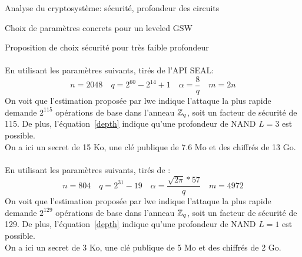 \begin{section}{Analyse du cryptosystème: sécurité, profondeur des circuits}
\begin{subsection}{Choix de paramètres concrets pour un leveled GSW}
	\begin{subsubsection}{Proposition de choix sécurité pour très faible profondeur}
	\paragraph{}
	En utilisant les paramètres suivants, tirés de l'API SEAL:
	\[n = 2048\quad q = 2^{60} - 2^{14} + 1 \quad \alpha = \frac{8}{q}\quad m = 2n \]
	On voit que l'estimation proposée par lwe indique  l'attaque la plus rapide demande $2^{115}$ opérations de base dans l'anneau $\mathbb{Z}_q$, soit un facteur de sécurité de 115. De plus, l'équation~\eqref{depth} indique qu'une profondeur de NAND $L=3$ est possible. \\
	On a ici un secret de 15 Ko, une clé publique de 7.6 Mo et des chiffrés de 13 Go.

	\paragraph{}
	En utilisant les paramètres suivants, tirés de \cite{cryptoeprint:2015:755}:
	\[n = 804\quad  q = 2^{31} - 19\quad \alpha = \frac{\sqrt{2\pi}*57}{q} \quad m = 4972\]
	On voit que l'estimation proposée par lwe indique  l'attaque la plus rapide demande $2^{129}$ opérations de base dans l'anneau $\mathbb{Z}_q$, soit un facteur de sécurité de 129. De plus, l'équation~\eqref{depth} indique qu'une profondeur de NAND $L=1$ est possible. \\
	On a ici un secret de 3 Ko, une clé publique de 5 Mo et des chiffrés de 2 Go.
	\end{subsubsection}

	\end{subsection}
\end{section}
